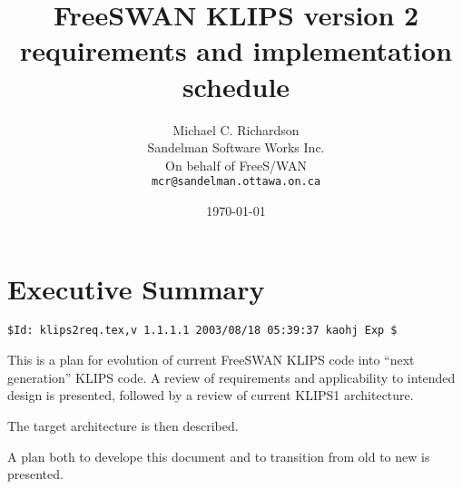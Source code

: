 \documentclass[titlepage]{article}
\author{Michael C. Richardson\\
	Sandelman Software Works Inc.\\
	On behalf of FreeS/WAN\\
	{\tt mcr@sandelman.ottawa.on.ca}}
\date{\today}
\title{FreeSWAN KLIPS version 2 requirements and implementation schedule}
\begin{document}
\maketitle\newpage

\section{Executive Summary}

\begin{verbatim}
$Id: klips2req.tex,v 1.1.1.1 2003/08/18 05:39:37 kaohj Exp $
\end{verbatim}

This is a plan for evolution of current FreeSWAN KLIPS code into ``next
generation'' KLIPS code. A review of requirements and applicability to
intended design is presented, followed by a review of current KLIPS1
architecture.

The target architecture is then described.

A plan both to develope this document and to transition from old to new is
presented.









\end{document}
